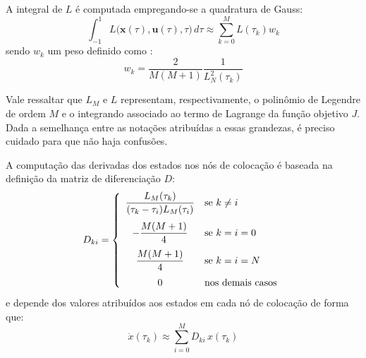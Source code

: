 
A integral de $L$ é computada empregando-se a quadratura de Gauss:
%
\begin{equation}
	\int_{-1}^{1} L \big( \mathbf{x}(\tau), \mathbf{u}(\tau), \tau \big) \, d\tau \approx \sum_{k=0}^{M} L(\tau_k) w_k
\end{equation}
%
sendo $ w_k $ um peso definido como \cite{becerra_tutorial_2010}:
%
\begin{equation}
	w_k = \frac{2}{M(M+1)} \frac{1}{L_N^2(\tau_k)}
\end{equation}

Vale ressaltar que $ L_M $ e $ L $ representam, respectivamente, o polinômio de Legendre de ordem $ M $ e o integrando associado ao termo de Lagrange da função objetivo $ J $. Dada a semelhança entre as notações atribuídas a essas grandezas, é preciso cuidado para que não haja confusões. 

A computação das derivadas dos estados nos nós de colocação é baseada na definição da matriz de diferenciação $ D $: 
%
\begin{equation}
	D_{ki} = \left\{
	\begin{array}{cl}
		\dfrac{L_M(\tau_k)}{(\tau_k - \tau_i)L_M(\tau_i)} & \text{se } k \neq i \vspace{0.25cm} \\
		-\dfrac{M(M+1)}{4} & \text{se } k = i = 0 \vspace{0.25cm}\\
		\dfrac{M(M+1)}{4} & \text{se } k = i = N \vspace{0.25cm} \\
		0 & \text{nos demais casos} 
	\end{array}
	\right.
\end{equation}  
%
e depende dos valores atribuídos aos estados em cada nó de colocação de forma que:
%
\begin{equation}
	\label{eq:revisao:aproximacaoDerivadas}
	\dot{x}(\tau_k) \approx \sum_{i=0}^{M} D_{ki} \, x(\tau_k)
\end{equation}
%

